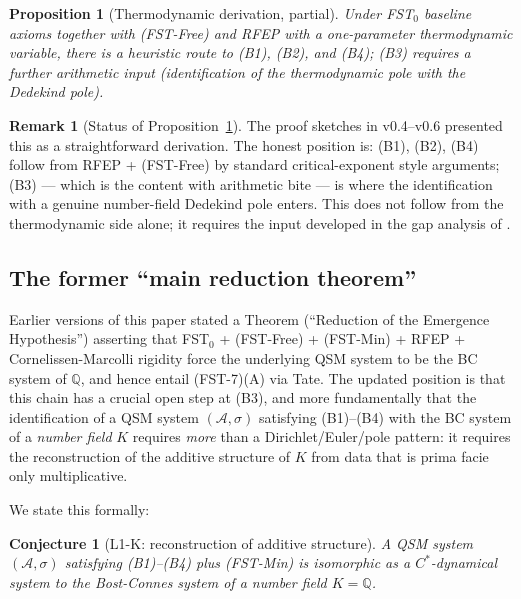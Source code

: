 \documentclass[11pt,a4paper]{article}
\theoremstyle{plain}
\newtheorem{proposition}[theorem]{Proposition}
\newtheorem{conjecture}[theorem]{Conjecture}
\theoremstyle{definition}
\newtheorem{remark}[theorem]{Remark}
\newcommand{\Q}{\mathbb{Q}}
\begin{document}
\begin{proposition}[Thermodynamic
derivation, partial]\label{prop:thermo-derivation}
Under FST$_0$ baseline axioms together with (FST-Free) and RFEP with
a one-parameter thermodynamic variable, there is a heuristic route
to (B1), (B2), and (B4); (B3) requires a further arithmetic input
(identification of the thermodynamic pole with the Dedekind pole).
\end{proposition}

\begin{remark}[Status of Proposition~\ref{prop:thermo-derivation}]
\label{rem:thermo-status}
The proof sketches in v0.4--v0.6 presented this as a straightforward
derivation.  The honest position is: (B1), (B2), (B4) follow from
RFEP + (FST-Free) by standard critical-exponent style arguments;
(B3) --- which is the content with arithmetic bite --- is where the
identification with a genuine number-field Dedekind pole enters.
This does not follow from the thermodynamic side alone; it requires
the input developed in the gap analysis of \cite{L1KAttack}.
\end{remark}

\subsection{The former ``main reduction theorem''}
\label{sec:former-reduction}

Earlier versions of this paper stated a Theorem (``Reduction of the
Emergence Hypothesis'') asserting that FST$_0$ + (FST-Free) +
(FST-Min) + RFEP + Cornelissen-Marcolli rigidity force the
underlying QSM system to be the BC system of $\Q$, and hence entail
(FST-7)(A) via Tate.  The updated position is that this chain has a
crucial open step at (B3), and more fundamentally that the
identification of a QSM system $(\mathcal A, \sigma)$ satisfying
(B1)--(B4) with the BC system of a \emph{number field} $K$ requires
\emph{more} than a Dirichlet/Euler/pole pattern: it requires the
reconstruction of the additive structure of $K$ from data that is
prima facie only multiplicative.

We state this formally:

\begin{conjecture}[L1-K: reconstruction of additive structure]
\label{conj:l1k}
A QSM system $(\mathcal A, \sigma)$ satisfying (B1)--(B4) plus
(FST-Min) is isomorphic as a $C^\ast$-dynamical system to the
Bost-Connes system of a number field $K = \Q$.
\end{conjecture}
\end{document}
